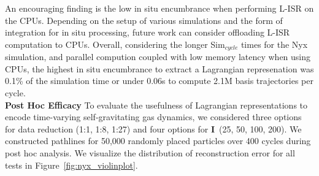 An encouraging finding is the low in situ encumbrance when performing L-ISR on the CPUs.
%
Depending on the setup of various simulations and the form of integration for in situ processing, future work can consider offloading L-ISR computation to CPUs.
%
Overall, considering the longer Sim$_{cycle}$ times for the Nyx simulation, and parallel compution coupled with low memory latency when using CPUs, the highest in situ encumbrance to extract a Lagrangian represenation was 0.1\% of the simulation time or under 0.06s to compute 2.1M basis trajectories per cycle.\\




\noindent\textbf{Post Hoc Efficacy}
To evaluate the usefulness of Lagrangian representations to encode time-varying self-gravitating gas dynamics, we considered three options for data reduction (1:1, 1:8, 1:27) and four options for \textbf{I}~(25, 50, 100, 200).
%
We constructed pathlines for 50,000 randomly placed particles over 400 cycles during post hoc analysis.
%
%
%
We visualize the distribution of reconstruction error for all tests in Figure~\ref{fig:nyx_violinplot}.
%

